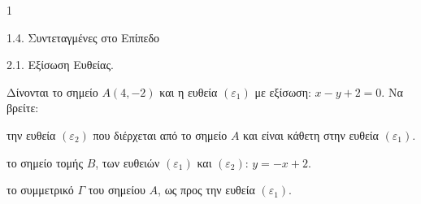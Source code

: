 \begin{ylh}{1}
    \item 1.4. Συντεταγμένες στο Επίπεδο
    \item 2.1. Εξίσωση Ευθείας.
\end{ylh}
Δίνονται το σημείο $A(4,-2)$ και η ευθεία $(\varepsilon_1)$ με εξίσωση: $x - y + 2 = 0$. Να βρείτε:
\begin{alist}
\item την ευθεία $(\varepsilon_2)$ που διέρχεται από το σημείο $A$ και είναι κάθετη στην ευθεία $(\varepsilon_1)$. 
\item το σημείο τομής $B$, των ευθειών $(\varepsilon_1)$ και $(\varepsilon_2)$: $y = -x + 2$. 
\item το συμμετρικό $\Gamma$ του σημείου $A$, ως προς την ευθεία $(\varepsilon_1)$. 
\end{alist}